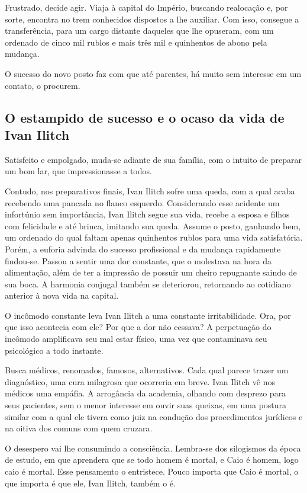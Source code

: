 \documentclass[12pt]{extarticle}
\begin{document}
Frustrado, decide agir. Viaja à capital do Império, buscando realocação
e, por sorte, encontra no trem conhecidos dispostos a lhe auxiliar. Com
isso, consegue a transferência, para um cargo distante daqueles que lhe
opuseram, com um ordenado de cinco mil rublos e mais três mil e
quinhentos de abono pela mudança.

O sucesso do novo posto faz com que até parentes, há muito sem interesse
em um contato, o procurem.

\subsection{O estampido de sucesso e o ocaso da vida de Ivan Ilitch}

Satisfeito e empolgado, muda-se adiante de sua família, com o intuito de
preparar um bom lar, que impressionasse a todos.

Contudo, nos preparativos finais, Ivan Ilitch sofre uma queda, com a
qual acaba recebendo uma pancada no flanco esquerdo. Considerando esse
acidente um infortúnio sem importância, Ivan Ilitch segue sua vida,
recebe a esposa e filhos com felicidade e até brinca, imitando sua
queda. Assume o posto, ganhando bem, um ordenado do qual faltam apenas
quinhentos rublos para uma vida satisfatória. Porém, a euforia advinda
do sucesso profissional e da mudança rapidamente findou-se. Passou a
sentir uma dor constante, que o molestava na hora da alimentação, além
de ter a impressão de possuir um cheiro repugnante saindo de sua boca. A
harmonia conjugal também se deteriorou, retornando ao cotidiano anterior
à nova vida na capital.

O incômodo constante leva Ivan Ilitch a uma constante irritabilidade.
Ora, por que isso acontecia com ele? Por que a dor não cessava? A
perpetuação do incômodo amplificava seu mal estar físico, uma vez que
contaminava seu psicológico a todo instante.

Busca médicos, renomados, famosos, alternativos. Cada qual parece trazer
um diagnóstico, uma cura milagrosa que ocorreria em breve. Ivan Ilitch
vê nos médicos uma empáfia. A arrogância da academia, olhando com
desprezo para seus pacientes, sem o menor interesse em ouvir suas
queixas, em uma postura similar com a qual ele tivera como juiz na
condução dos procedimentos jurídicos e na oitiva dos comuns com quem
cruzara.

O desespero vai lhe consumindo a consciência. Lembra-se dos silogismos
da época de estudo, em que aprendera que se todo homem é mortal, e Caio
é homem, logo caio é mortal. Esse pensamento o entristece. Pouco importa
que Caio é mortal, o que importa é que ele, Ivan Ilitch, também o é.
\end{document}
